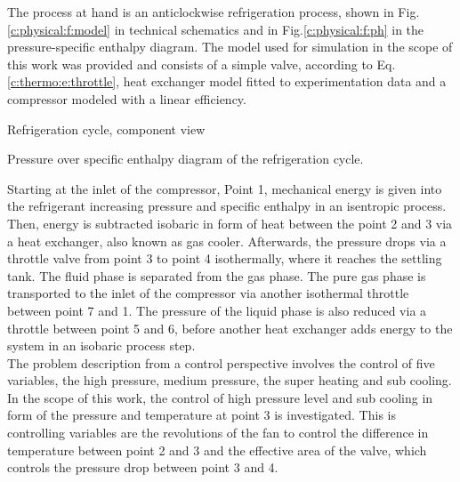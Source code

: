 The process at hand is an anticlockwise refrigeration process, shown in Fig.\ref{c:physical:f:model} in technical schematics and in Fig.\ref{c:physical:f:ph} in the pressure-specific enthalpy diagram. The model used for simulation in the scope of this work was provided and consists of a simple valve, according to Eq.\ref{c:thermo:e:throttle}, heat exchanger model fitted to experimentation data and a compressor modeled with a linear efficiency.\\

\begin{minipage}[c]{0.45\textwidth}

\caption{Refrigeration cycle, component view}
\label{c:physical:f:model}
\end{minipage}%
\hspace{0.05\textwidth}%
\begin{minipage}[c]{0.45\textwidth}

\caption{Pressure over specific enthalpy diagram of the refrigeration cycle. }
\label{c:physical:f:ph}
\end{minipage}

Starting at the inlet of the compressor, Point 1, mechanical energy is given into the refrigerant increasing pressure and specific enthalpy in an isentropic process. Then, energy is subtracted isobaric in form of heat between the point 2 and 3 via a heat exchanger, also known as gas cooler. Afterwards, the pressure drops via a throttle valve from point 3 to point 4 isothermally, where it reaches the settling tank. The fluid phase is separated from the gas phase. The pure gas phase is transported to the inlet of the compressor via another isothermal throttle between point 7 and 1. The pressure of the liquid phase is also reduced via a throttle between point 5 and 6, before another heat exchanger adds energy to the system in an isobaric process step.\\

The problem description from a control perspective involves the control of five variables, the high pressure, medium pressure, the super heating and sub cooling. In the scope of this work, the control of high pressure level and sub cooling in form of the pressure and temperature at point 3 is investigated. This is controlling variables are the revolutions of the fan to control the difference in temperature between point 2 and 3 and the effective area of the valve, which controls the pressure drop between point 3 and 4.\\

